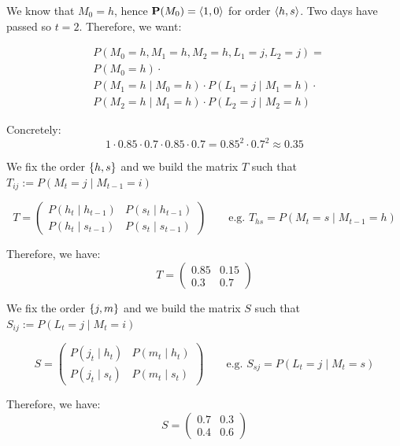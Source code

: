 We know that $M_0 = h$, hence $\textbf{P}(M_0) = \left\langle 1, 0 \right\rangle$ for order $\left\langle h,s \right\rangle$. Two days have passed so $t=2$. Therefore, we want:

\begin{align*}
&P(M_0 = h, M_1 = h, M_2 = h, L_1 = j, L_2 = j) = \\ 
&P(M_0 = h) \cdot \\
&P(M_1 = h \mid M_0 = h) \cdot P(L_1 = j \mid M_1 = h) \cdot \\ 
&P(M_2 = h \mid M_1 = h) \cdot P(L_2 = j \mid M_2 = h)
\end{align*}

Concretely:
\[
1 \cdot 0.85 \cdot 0.7 \cdot 0.85 \cdot 0.7 = 0.85^2 \cdot 0.7^2 \approx 0.35
\]


We fix the order $\left\{h,s\right\}$ and we build the matrix $T$ such that $T_{ij} := P(M_t = j \mid M_{t-1} = i)$

\[
T =
\begin{pmatrix}
P(h_t \mid h_{t-1}) & P(s_t \mid h_{t-1}) \\
P(h_t  \mid s_{t-1}) & P(s_t \mid s_{t-1})
\end{pmatrix}
\qquad
\text{e.g. } T_{hs} = P(M_t = s \mid M_{t-1} = h)
\] 

Therefore, we have:
\[
T = \begin{pmatrix}
0.85 & 0.15 \\
0.3 & 0.7
\end{pmatrix}
\]


We fix the order $\left\{j,m\right\}$ and we build the matrix $S$ such that $S_{ij} := P(L_t = j \mid M_t = i)$

\[
S =
\begin{pmatrix}
P(j_t \mid h_t) & P(m_t \mid h_t) \\
P(j_t  \mid s_t) & P(m_t \mid s_t)
\end{pmatrix}
\qquad
\text{e.g. } S_{sj} = P(L_t = j \mid M_t = s)
\] 

Therefore, we have:
\[
S = \begin{pmatrix}
0.7 & 0.3 \\
0.4 & 0.6
\end{pmatrix}
\]


